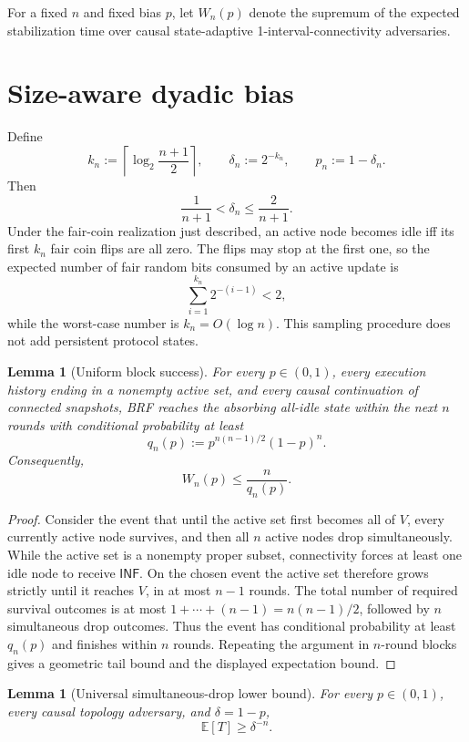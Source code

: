 \documentclass[11pt]{article}
\newtheorem{lemma}[theorem]{Lemma}
\newcommand{\E}{\mathbb{E}}
\begin{document}
For a fixed $n$ and fixed bias $p$, let $W_n(p)$ denote the supremum of the
expected stabilization time over causal state-adaptive
1-interval-connectivity adversaries.

\section{Size-aware dyadic bias}

Define
\[
  k_n:=\left\lceil \log_2\frac{n+1}{2}\right\rceil,
  \qquad
  \delta_n:=2^{-k_n},
  \qquad
  p_n:=1-\delta_n.
\]
Then
\[
  \frac1{n+1}<\delta_n\le \frac2{n+1}.
\]
Under the fair-coin realization just described, an active node becomes idle
iff its first $k_n$ fair coin flips are all zero.  The flips may stop at the
first one, so the expected number of fair random bits consumed by an active
update is
\[
  \sum_{i=1}^{k_n}2^{-(i-1)}<2,
\]
while the worst-case number is $k_n=O(\log n)$.  This sampling procedure does
not add persistent protocol states.

\begin{lemma}[Uniform block success]
For every $p\in(0,1)$, every execution history ending in a nonempty active set,
and every causal continuation of connected snapshots, BRF reaches the
absorbing all-idle state within the next $n$ rounds with conditional
probability at least
\[
  q_n(p):=p^{n(n-1)/2}{(1-p)}^n.
\]
Consequently,
\[
  W_n(p)\le \frac{n}{q_n(p)}.
\]
\end{lemma}

\begin{proof}
Consider the event that until the active set first becomes all of $V$, every
currently active node survives, and then all $n$ active nodes drop
simultaneously.  While the active set is a nonempty proper subset, connectivity
forces at least one idle node to receive $\mathsf{INF}$.  On the chosen event
the active set therefore grows strictly until it reaches $V$, in at most
$n-1$ rounds.  The total number of required survival outcomes is at most
$1+\cdots+(n-1)=n(n-1)/2$, followed by $n$ simultaneous drop outcomes.
Thus the event has conditional probability at least $q_n(p)$ and finishes
within $n$ rounds.  Repeating the argument in $n$-round blocks gives a
geometric tail bound and the displayed expectation bound.
\end{proof}

\begin{lemma}[Universal simultaneous-drop lower bound]
For every $p\in(0,1)$, every causal topology adversary, and
$\delta=1-p$,
\[
  \E[T]\ge \delta^{-n}.
\]
\end{lemma}
\end{document}
